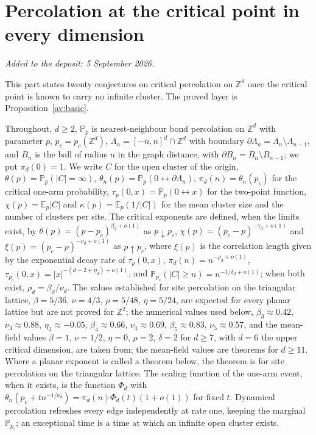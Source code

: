 \documentclass[11pt]{article}
\theoremstyle{definition}
\newcommand{\E}{\mathbb E}
\newcommand{\Pp}{\mathbb P}
\newcommand{\Z}{\mathbb Z}
\providecommand{\Z}{\mathbb Z}
\providecommand{\E}{\mathbb E}
\providecommand{\Pp}{\mathbb P}
\begin{document}
\part{Percolation at the critical point in every dimension}

\medskip\noindent\emph{Added to the deposit: 5 September 2026.}\par\medskip

This part states twenty conjectures on critical percolation on $\Z^d$ once the critical point is known to carry no infinite cluster.  The proved layer is Proposition~\ref{av:basic}.

Throughout, $d\ge2$, $\Pp_p$ is nearest-neighbour bond percolation on
$\Z^d$ with parameter $p$, $p_c=p_c(\Z^d)$, $\Lambda_n=[-n,n]^d\cap\Z^d$
with boundary $\partial\Lambda_n=\Lambda_n\setminus\Lambda_{n-1}$, and
$B_n$ is the ball of radius $n$ in the graph distance, with
$\partial B_n=B_n\setminus B_{n-1}$; we put $\pi_d(0)=1$.  We write
$C$ for the open cluster of the origin,
$\theta(p)=\Pp_p(|C|=\infty)$, $\theta_n(p)=\Pp_p(0\leftrightarrow\partial\Lambda_n)$,
$\pi_d(n)=\theta_n(p_c)$ for the critical one-arm probability,
$\tau_p(0,x)=\Pp_p(0\leftrightarrow x)$ for the two-point function,
$\chi(p)=\E_p|C|$ and $\kappa(p)=\E_p(1/|C|)$ for the mean cluster size
and the number of clusters per site.  The critical exponents are
defined, when the limits exist, by
$\theta(p)=(p-p_c)^{\beta_d+o(1)}$ as $p\downarrow p_c$,
$\chi(p)=(p_c-p)^{-\gamma_d+o(1)}$ and $\xi(p)=(p_c-p)^{-\nu_d+o(1)}$
as $p\uparrow p_c$, where $\xi(p)$ is the correlation length given by
the exponential decay rate of $\tau_p(0,x)$, $\pi_d(n)=n^{-\rho_d+o(1)}$,
$\tau_{p_c}(0,x)=|x|^{-(d-2+\eta_d)+o(1)}$, and
$\Pp_{p_c}(|C|\ge n)=n^{-1/\delta_d+o(1)}$; when both exist,
$\rho_d=\beta_d/\nu_d$.  The values established for site percolation on
the triangular lattice, $\beta=5/36$, $\nu=4/3$, $\rho=5/48$,
$\eta=5/24$, are expected
for every planar lattice but are not proved for $\Z^2$; the numerical
values used below, $\beta_3\approx0.42$, $\nu_3\approx0.88$,
$\eta_3\approx-0.05$, $\beta_4\approx0.66$, $\nu_4\approx0.69$,
$\beta_5\approx0.83$, $\nu_5\approx0.57$, and the mean-field values
$\beta=1$, $\nu=1/2$, $\eta=0$, $\rho=2$, $\delta=2$ for $d\ge7$, with
$d=6$ the upper critical dimension, are taken
from; the mean-field
values are theorems for $d\ge11$.
Where a planar exponent is called a theorem below, the theorem is for
site percolation on the triangular lattice.  The scaling function of the
one-arm event, when it exists, is the function $\Phi_d$ with
$\theta_n(p_c+tn^{-1/\nu_d})=\pi_d(n)\Phi_d(t)(1+o(1))$ for fixed $t$.
Dynamical percolation refreshes every edge independently at rate one,
keeping the marginal $\Pp_{p_c}$; an exceptional time is a time at which
an infinite open cluster exists.
\end{document}
